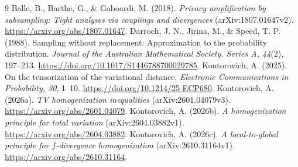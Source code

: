 \documentclass[11pt,a4paper]{article}
\theoremstyle{definition}\newtheorem{definition}[theorem]{Definition}
\theoremstyle{remark}\newtheorem{remark}[theorem]{Remark}
\begin{document}
\begin{thebibliography}{9}
 Balle, B., Barthe, G., \& Gaboardi, M. (2018). \emph{Privacy amplification by subsampling: Tight analyses via couplings and divergences} (arXiv:1807.01647v2). \url{https://arxiv.org/abs/1807.01647}.
 Darroch, J. N., Jirina, M., \& Speed, T. P. (1988). Sampling without replacement: Approximation to the probability distribution. \emph{Journal of the Australian Mathematical Society. Series A, 44}(2), 197--213. \url{https://doi.org/10.1017/S1446788700029785}.
 Kontorovich, A. (2025). On the tensorization of the variational distance. \emph{Electronic Communications in Probability, 30}, 1--10. \url{https://doi.org/10.1214/25-ECP680}.
 Kontorovich, A. (2026a). \emph{TV homogenization inequalities} (arXiv:2601.04079v3). \url{https://arxiv.org/abs/2601.04079}.
 Kontorovich, A. (2026b). \emph{A homogenization principle for total variation} (arXiv:2604.03882v1). \url{https://arxiv.org/abs/2604.03882}.
 Kontorovich, A. (2026c). \emph{A local-to-global principle for $f$-divergence homogenization} (arXiv:2610.31164v1). \url{https://arxiv.org/abs/2610.31164}.
\end{thebibliography}
\end{document}
